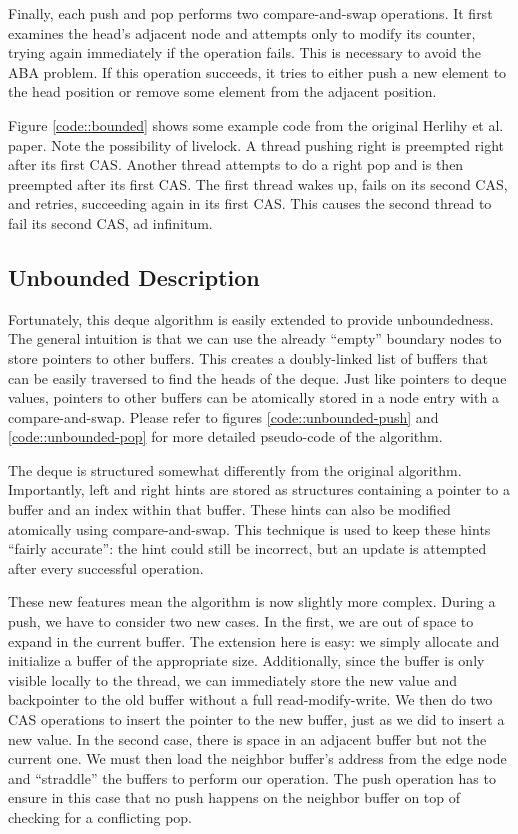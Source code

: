 \documentclass[11pt, letterpaper]{article}
\begin{document}
            Finally, each push and pop performs two compare-and-swap operations. It first examines the head's adjacent node and attempts only to modify its counter, trying again immediately if the operation fails. This is necessary to avoid the ABA problem. If this operation succeeds, it tries to either push a new element to the head position or remove some element from the adjacent position.

            Figure \ref{code::bounded} shows some example code from the original Herlihy et al. paper. Note the possibility of livelock. A thread pushing right is preempted right after its first CAS. Another thread attempts to do a right pop and is then preempted after its first CAS. The first thread wakes up, fails on its second CAS, and retries, succeeding again in its first CAS. This causes the second thread to fail its second CAS, ad infinitum.

        \subsection{Unbounded Description}
            Fortunately, this deque algorithm is easily extended to provide unboundedness. The general intuition is that we can use the already ``empty'' boundary nodes to store pointers to other buffers. This creates a doubly-linked list of buffers that can be easily traversed to find the heads of the deque. Just like pointers to deque values, pointers to other buffers can be atomically stored in a node entry with a compare-and-swap. Please refer to figures \ref{code::unbounded-push} and \ref{code::unbounded-pop} for more detailed pseudo-code of the algorithm.

            The deque is structured somewhat differently from the original algorithm. Importantly, left and right hints are stored as structures containing a pointer to a buffer and an index within that buffer. These hints can also be modified atomically using compare-and-swap. This technique is used to keep these hints ``fairly accurate'': the hint could still be incorrect, but an update is attempted after every successful operation.

            These new features mean the algorithm is now slightly more complex. During a push, we have to consider two new cases. In the first, we are out of space to expand in the current buffer. The extension here is easy: we simply allocate and initialize a buffer of the appropriate size. Additionally, since the buffer is only visible locally to the thread, we can immediately store the new value and backpointer to the old buffer without a full read-modify-write. We then do two CAS operations to insert the pointer to the new buffer, just as we did to insert a new value. In the second case, there is space in an adjacent buffer but not the current one. We must then load the neighbor buffer's address from the edge node and ``straddle'' the buffers to perform our operation. The push operation has to ensure in this case that no push happens on the neighbor buffer on top of checking for a conflicting pop.
\end{document}
